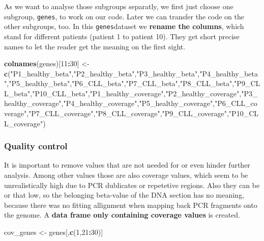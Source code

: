 \documentclass[]{article}
\newenvironment{Shaded}{\begin{snugshade}}{\end{snugshade}}
\newcommand{\KeywordTok}[1]{\textcolor[rgb]{0.13,0.29,0.53}{\textbf{#1}}}
\newcommand{\DecValTok}[1]{\textcolor[rgb]{0.00,0.00,0.81}{#1}}
\newcommand{\StringTok}[1]{\textcolor[rgb]{0.31,0.60,0.02}{#1}}
\newcommand{\OperatorTok}[1]{\textcolor[rgb]{0.81,0.36,0.00}{\textbf{#1}}}
\newcommand{\NormalTok}[1]{#1}
\begin{document}
As we want to analyse those subgroups separatly, we first just choose
one subgroup, \texttt{genes}, to work on our code. Later we can transfer
the code on the other subgroups, too. In this \texttt{genes}dataset we
\textbf{rename the columns}, which stand for different patients (patient
1 to patient 10). They get short precise names to let the reader get the
meaning on the first sight.

\begin{Shaded}
\begin{Highlighting}[]
\KeywordTok{colnames}\NormalTok{(genes)[}\DecValTok{11}\OperatorTok{:}\DecValTok{30}\NormalTok{] <-}\StringTok{ }\KeywordTok{c}\NormalTok{(}\StringTok{"P1_healthy_beta"}\NormalTok{,}\StringTok{"P2_healthy_beta"}\NormalTok{,}\StringTok{"P3_healthy_beta"}\NormalTok{,}\StringTok{"P4_healthy_beta"}\NormalTok{,}\StringTok{"P5_healthy_beta"}\NormalTok{,}\StringTok{"P6_CLL_beta"}\NormalTok{,}\StringTok{"P7_CLL_beta"}\NormalTok{,}\StringTok{"P8_CLL_beta"}\NormalTok{,}\StringTok{"P9_CLL_beta"}\NormalTok{,}\StringTok{"P10_CLL_beta"}\NormalTok{,}\StringTok{"P1_healthy_coverage"}\NormalTok{,}\StringTok{"P2_healthy_coverage"}\NormalTok{,}\StringTok{"P3_healthy_coverage"}\NormalTok{,}\StringTok{"P4_healthy_coverage"}\NormalTok{,}\StringTok{"P5_healthy_coverage"}\NormalTok{,}\StringTok{"P6_CLL_coverage"}\NormalTok{,}\StringTok{"P7_CLL_coverage"}\NormalTok{,}\StringTok{"P8_CLL_coverage"}\NormalTok{,}\StringTok{"P9_CLL_coverage"}\NormalTok{,}\StringTok{"P10_CLL_coverage"}\NormalTok{)}
\end{Highlighting}
\end{Shaded}

\subsubsection{Quality control}\label{quality-control}

It is important to remove values that are not needed for or even hinder
further analysis. Among other values those are also coverage values,
which seem to be unrealistically high due to PCR dublicates or
repetetive regions. Also they can be or that low, so the belonging
beta-value of the DNA section has no meaning, because there was no
fitting allignment when mapping back PCR fragments onto the genome. A
\textbf{data frame only containing coverage values} is created.

\begin{Shaded}
\begin{Highlighting}[]
\NormalTok{cov_genes <-}\StringTok{ }\NormalTok{genes[,}\KeywordTok{c}\NormalTok{(}\DecValTok{1}\NormalTok{,}\DecValTok{21}\OperatorTok{:}\DecValTok{30}\NormalTok{)]}
\end{Highlighting}
\end{Shaded}
\end{document}
